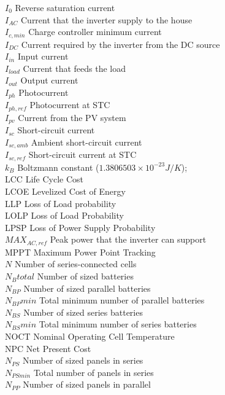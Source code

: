 $I_{0}$ Reverse saturation current \\
$ I_{AC} $ Current that the inverter supply to the house \\
$I_{c,min}$ Charge controller minimum current \\
$ I_{DC} $ Current required by the inverter from the DC source \\
$ I_{in} $ Input current \\
$I_{load}$ Current that feeds the load \\
$ I_{out} $ Output current \\
$I_{ph}$ Photocurrent \\
$ I_{ph,ref} $ Photocurrent at STC \\
$I_{pv}$ Current from the PV system \\
$ I_{sc} $ Short-circuit current \\
$ I_{sc,amb} $ Ambient short-circuit current \\
$ I_{sc,ref} $ Short-circuit current at STC \\
$ k_{B} $ Boltzmann constant ($ 1.3806503\times10^{-23}J/K $); \\
LCC  Life Cycle Cost \\
LCOE Levelized Cost of Energy \\
LLP  Loss of Load probability \\
LOLP Loss of Load Probability \\
LPSP Loss of Power Supply Probability \\
$MAX_{AC,ref}$ Peak power that the inverter can support \\
MPPT Maximum Power Point Tracking \\
$N$ Number of series-connected cells \\
$N_{B}total$ Number of sized batteries \\
$N_{BP}$ Number of sized parallel batteries \\
$N_{BP}min$ Total minimum number of parallel batteries \\
$N_{BS}$ Number of sized series batteries \\
$N_{BS}min$ Total minimum number of series batteries \\
NOCT Nominal Operating Cell Temperature \\
NPC  Net Present Cost \\
$N_{PS}$ Number of sized panels in series \\
$N_{PSmin}$ Total number of panels in series \\
$N_{PP}$ Number of sized panels in parallel \\
